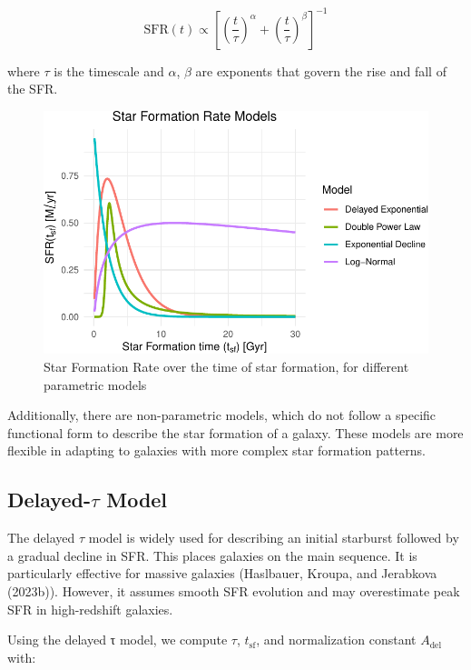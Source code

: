 \documentclass[
]{article}
\begin{document}
\[
  \text{SFR}(t) \propto \left[\left(\frac{t}{\tau}\right)^\alpha + \left(\frac{t}{\tau}\right)^\beta\right]^{-1}
\]

where \(\tau\) is the timescale and \(\alpha\), \(\beta\) are exponents
that govern the rise and fall of the SFR.

\begin{figure}[H]

{\centering \includegraphics{thesis_files/figure-pdf/unnamed-chunk-2-1.pdf}

}

\caption{Star Formation Rate over the time of star formation, for
different parametric models}

\end{figure}%

Additionally, there are non-parametric models, which do not follow a
specific functional form to describe the star formation of a galaxy.
These models are more flexible in adapting to galaxies with more complex
star formation patterns.

\subsection{\texorpdfstring{Delayed-\(τ\)
Model}{Delayed-τ Model}}\label{delayed-ux3c4-model}

The delayed \(τ\) model is widely used for describing an initial
starburst followed by a gradual decline in SFR. This places galaxies on
the main sequence. It is particularly effective for massive galaxies
(Haslbauer, Kroupa, and Jerabkova (2023b)). However, it assumes smooth
SFR evolution and may overestimate peak SFR in high-redshift galaxies.

Using the delayed τ model, we compute \(\tau\), \(t_{\text{sf}}\), and
normalization constant \(A_{\text{del}}\) with:
\end{document}
